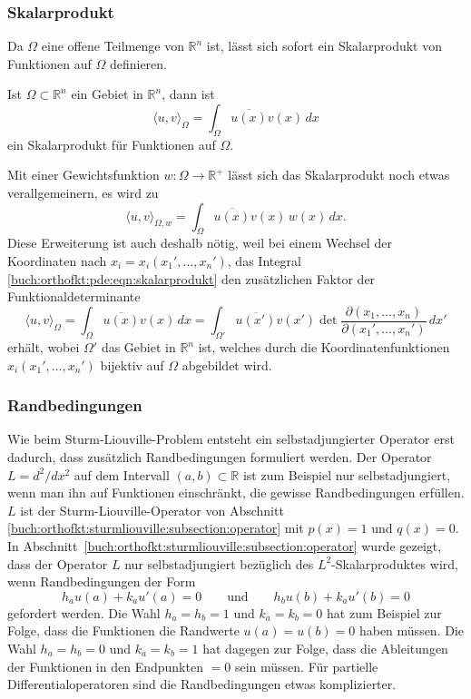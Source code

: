 %
%
\subsubsection{Skalarprodukt}
Da $\Omega$ eine offene Teilmenge von $\mathbb{R}^n$ ist, lässt sich
sofort ein Skalarprodukt von Funktionen auf $\Omega$ definieren.

\begin{definition}
Ist $\Omega\subset \mathbb{R}^n$ ein Gebiet in $\mathbb{R}^n$, dann ist
\begin{equation}
\langle u,v\rangle_\Omega
=
\int_{\Omega}  \overline{u(x)} v(x)\,dx
\label{buch:orthofkt:pde:eqn:skalarprodukt}
\end{equation}
ein Skalarprodukt für Funktionen auf $\Omega$.
\end{definition}

Mit einer Gewichtsfunktion $w\colon \Omega \to \mathbb{R}^+$ lässt sich
das Skalarprodukt noch etwas verallgemeinern, es wird zu
\[
\langle u,v\rangle_{\Omega,w}
=
\int_{\Omega} \overline{u(x)}v(x)\,w(x)\,dx.
\]
Diese Erweiterung ist auch deshalb nötig, weil bei einem Wechsel
der Koordinaten nach $x_i=x_i(x_1',\dots,x_n')$, das Integral
\eqref{buch:orthofkt:pde:eqn:skalarprodukt}
den zusätzlichen Faktor der Funktionaldeterminante 
\[
\langle u,v\rangle_{\Omega}
=
\int_{\Omega} \overline{u(x)} v(x)\,dx 
=
\int_{\Omega'} \overline{u(x')} v(x')
\det\frac{\partial(x_1,\dots,x_n)}{\partial(x_1',\dots,x_n')}
\,dx'
\]
erhält, wobei $\Omega'$ das Gebiet in $\mathbb{R}^n$ ist, welches
durch die Koordinatenfunktionen $x_i(x_1',\dots,x_n')$ bijektiv auf
$\Omega$ abgebildet wird.


%
%
\subsubsection{Randbedingungen}
Wie beim Sturm-Liouville-Problem entsteht ein selbstadjungierter Operator
erst dadurch, dass zusätzlich Randbedingungen formuliert werden.
Der Operator $L=d^2/dx^2$ auf dem Intervall $(a,b)\subset\mathbb{R}$
ist zum Beispiel nur selbstadjungiert, wenn man ihn auf Funktionen
einschränkt, die gewisse Randbedingungen erfüllen.
$L$ ist der Sturm-Liouville-Operator von Abschnitt
\ref{buch:orthofkt:sturmliouville:subsection:operator}
mit $p(x)=1$ und $q(x)=0$.
In Abschnitt~\ref{buch:orthofkt:sturmliouville:subsection:operator}
wurde gezeigt, dass der Operator $L$ nur selbstadjungiert bezüglich
des $L^2$-Skalarproduktes wird, wenn Randbedingungen der Form
\begin{equation}
h_a u(a) + k_a u'(a) =  0
\qquad\text{und}\qquad
h_b u(b) + k_a u'(b) =  0
\end{equation}
gefordert werden.
Die Wahl $h_a=h_b=1$ und $k_a=k_b=0$ hat zum Beispiel zur Folge,
dass die Funktionen die Randwerte $u(a)=u(b)=0$ haben müssen.
Die Wahl $h_a=h_b=0$ und $k_a=k_b=1$ hat dagegen zur Folge,
dass die Ableitungen der Funktionen in den Endpunkten $=0$ sein
müssen.
Für partielle Differentialoperatoren sind die Randbedingungen
etwas komplizierter.

